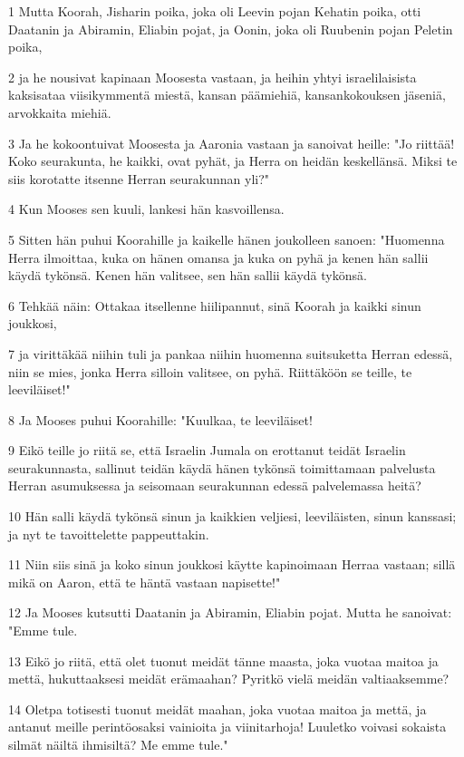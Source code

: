 \par 1 Mutta Koorah, Jisharin poika, joka oli Leevin pojan Kehatin poika, otti Daatanin ja Abiramin, Eliabin pojat, ja Oonin, joka oli Ruubenin pojan Peletin poika,
\par 2 ja he nousivat kapinaan Moosesta vastaan, ja heihin yhtyi israelilaisista kaksisataa viisikymmentä miestä, kansan päämiehiä, kansankokouksen jäseniä, arvokkaita miehiä.
\par 3 Ja he kokoontuivat Moosesta ja Aaronia vastaan ja sanoivat heille: "Jo riittää! Koko seurakunta, he kaikki, ovat pyhät, ja Herra on heidän keskellänsä. Miksi te siis korotatte itsenne Herran seurakunnan yli?"
\par 4 Kun Mooses sen kuuli, lankesi hän kasvoillensa.
\par 5 Sitten hän puhui Koorahille ja kaikelle hänen joukolleen sanoen: "Huomenna Herra ilmoittaa, kuka on hänen omansa ja kuka on pyhä ja kenen hän sallii käydä tykönsä. Kenen hän valitsee, sen hän sallii käydä tykönsä.
\par 6 Tehkää näin: Ottakaa itsellenne hiilipannut, sinä Koorah ja kaikki sinun joukkosi,
\par 7 ja virittäkää niihin tuli ja pankaa niihin huomenna suitsuketta Herran edessä, niin se mies, jonka Herra silloin valitsee, on pyhä. Riittäköön se teille, te leeviläiset!"
\par 8 Ja Mooses puhui Koorahille: "Kuulkaa, te leeviläiset!
\par 9 Eikö teille jo riitä se, että Israelin Jumala on erottanut teidät Israelin seurakunnasta, sallinut teidän käydä hänen tykönsä toimittamaan palvelusta Herran asumuksessa ja seisomaan seurakunnan edessä palvelemassa heitä?
\par 10 Hän salli käydä tykönsä sinun ja kaikkien veljiesi, leeviläisten, sinun kanssasi; ja nyt te tavoittelette pappeuttakin.
\par 11 Niin siis sinä ja koko sinun joukkosi käytte kapinoimaan Herraa vastaan; sillä mikä on Aaron, että te häntä vastaan napisette!"
\par 12 Ja Mooses kutsutti Daatanin ja Abiramin, Eliabin pojat. Mutta he sanoivat: "Emme tule.
\par 13 Eikö jo riitä, että olet tuonut meidät tänne maasta, joka vuotaa maitoa ja mettä, hukuttaaksesi meidät erämaahan? Pyritkö vielä meidän valtiaaksemme?
\par 14 Oletpa totisesti tuonut meidät maahan, joka vuotaa maitoa ja mettä, ja antanut meille perintöosaksi vainioita ja viinitarhoja! Luuletko voivasi sokaista silmät näiltä ihmisiltä? Me emme tule."
